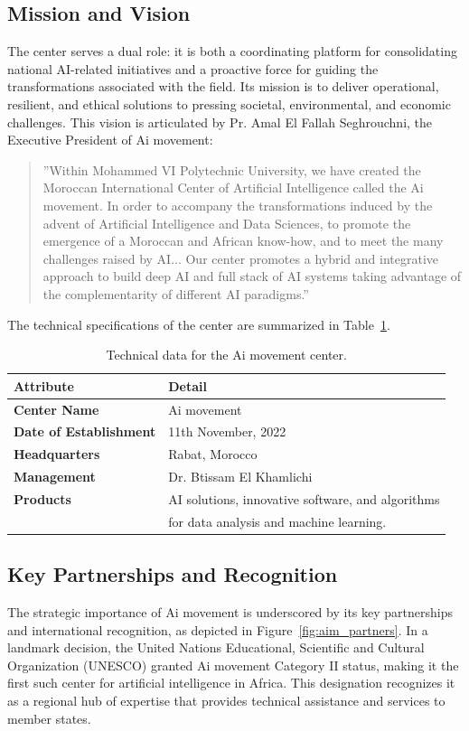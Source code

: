 \documentclass[../Main.tex]{subfiles}
\begin{document}
\subsection{Mission and Vision}
The center serves a dual role: it is both a coordinating platform for consolidating national AI-related initiatives and a proactive force for guiding the transformations associated with the field. Its mission is to deliver operational, resilient, and ethical solutions to pressing societal, environmental, and economic challenges. This vision is articulated by Pr. Amal El Fallah Seghrouchni, the Executive President of Ai movement:
\begin{quote}
    ”Within Mohammed VI Polytechnic University, we have created the Moroccan International Center of Artificial Intelligence called the Ai movement. In order to accompany the transformations induced by the advent of Artificial Intelligence and Data Sciences, to promote the emergence of a Moroccan and African know-how, and to meet the many challenges raised by AI... Our center promotes a hybrid and integrative approach to build deep AI and full stack of AI systems taking advantage of the complementarity of different AI paradigms.”
\end{quote}

The technical specifications of the center are summarized in Table~\ref{tab:aim_data}.

\begin{table}[H]
\centering
\caption{Technical data for the Ai movement center.}
\label{tab:aim_data}
\begin{tabular}{@{}ll@{}}
\toprule
\textbf{Attribute} & \textbf{Detail} \\ \midrule
\textbf{Center Name} & Ai movement \\
\textbf{Date of Establishment} & 11th November, 2022 \\
\textbf{Headquarters} & Rabat, Morocco \\
\textbf{Management} & Dr. Btissam El Khamlichi \\
\textbf{Products} & AI solutions, innovative software, and algorithms \\
& for data analysis and machine learning. \\ \bottomrule
\end{tabular}
\end{table}

\subsection{Key Partnerships and Recognition}
The strategic importance of Ai movement is underscored by its key partnerships and international recognition, as depicted in Figure~\ref{fig:aim_partners}. In a landmark decision, the United Nations Educational, Scientific and Cultural Organization (UNESCO) granted Ai movement Category II status, making it the first such center for artificial intelligence in Africa. This designation recognizes it as a regional hub of expertise that provides technical assistance and services to member states.
\end{document}
